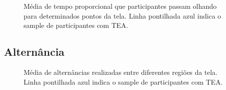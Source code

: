 \documentclass{article}
\begin{document}
\begin{figure}[H]
  \caption{Média de tempo proporcional que participantes passam olhando para determinados pontos da tela. Linha pontilhada azul indica o sample de participantes com TEA.}
  \noindent{}
  \centering
\end{figure}

\subsection{Alternância}

\begin{figure}[H]
  \caption{Média de alternâncias realizadas entre diferentes regiões da tela. Linha pontilhada azul indica o sample de participantes com TEA.}
  \noindent{}
  \centering
\end{figure}
\end{document}
